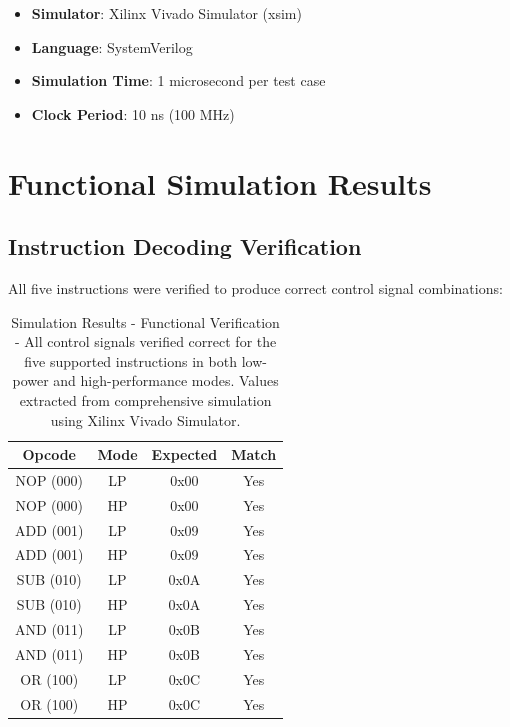 \documentclass[15pt,a4paper]{report}
\begin{document}
\begin{itemize}
    \item \textbf{Simulator}: Xilinx Vivado Simulator (xsim)
    \item \textbf{Language}: SystemVerilog
    \item \textbf{Simulation Time}: 1 microsecond per test case
    \item \textbf{Clock Period}: 10 ns (100 MHz)
\end{itemize}

\section{Functional Simulation Results}

\subsection{Instruction Decoding Verification}

All five instructions were verified to produce correct control signal combinations:

\begin{table}[H]
    \centering
    \begin{tabular}{|c|c|c|c|}
        \hline
        \textbf{Opcode} & \textbf{Mode} & \textbf{Expected} & \textbf{Match} \\
        \hline
        NOP (000) & LP & 0x00 & Yes \\
        NOP (000) & HP & 0x00 & Yes \\
        \hline
        ADD (001) & LP & 0x09 & Yes \\
        ADD (001) & HP & 0x09 & Yes \\
        \hline
        SUB (010) & LP & 0x0A & Yes \\
        SUB (010) & HP & 0x0A & Yes \\
        \hline
        AND (011) & LP & 0x0B & Yes \\
        AND (011) & HP & 0x0B & Yes \\
        \hline
        OR (100) & LP & 0x0C & Yes \\
        OR (100) & HP & 0x0C & Yes \\
        \hline
    \end{tabular}
    \label{tab:sim_functional}
    \caption{Simulation Results - Functional Verification - All control signals verified correct for the five supported instructions in both low-power and high-performance modes. Values extracted from comprehensive simulation using Xilinx Vivado Simulator.}
\end{table}
\end{document}
